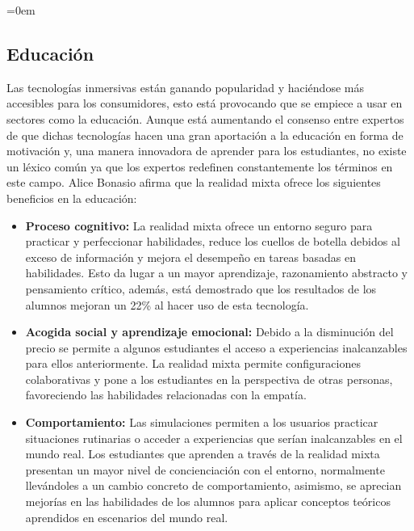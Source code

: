 \parindent=0em
\subsection{Educación}
\noindent

Las tecnologías inmersivas están ganando popularidad y haciéndose más accesibles para los consumidores, esto está provocando que se empiece a usar en sectores como la educación. Aunque está aumentando el consenso entre expertos de que dichas tecnologías hacen una gran aportación a la educación en forma de motivación y, una manera innovadora de aprender para los estudiantes, no existe un léxico común ya que los expertos redefinen constantemente los términos en este campo. Alice Bonasio \cite{microsoftEducation} afirma que la realidad mixta ofrece los siguientes beneficios en la educación:

\begin{itemize}
    \item \textbf{Proceso cognitivo:} La realidad mixta ofrece un entorno seguro para practicar y perfeccionar habilidades, reduce los cuellos de botella debidos al exceso de información y mejora el desempeño en tareas basadas en habilidades. Esto da lugar a un mayor aprendizaje, razonamiento abstracto y pensamiento crítico, además, está demostrado que los resultados de los alumnos mejoran un 22\% al hacer uso de esta tecnología. 
    
     \item \textbf{Acogida social y aprendizaje emocional:} Debido a la disminución del precio se permite a algunos estudiantes el acceso a experiencias inalcanzables para ellos anteriormente. La realidad mixta permite configuraciones colaborativas y pone a los estudiantes en la perspectiva de otras personas, favoreciendo las habilidades relacionadas con la empatía.
     
     \item \textbf{Comportamiento:} Las simulaciones permiten a los usuarios practicar situaciones rutinarias o acceder a experiencias que serían inalcanzables en el mundo real. Los estudiantes que aprenden a través de la realidad mixta presentan un mayor nivel de concienciación con el entorno, normalmente llevándoles a un cambio concreto de comportamiento, asimismo, se aprecian mejorías en las habilidades de los alumnos para aplicar conceptos teóricos aprendidos en escenarios del mundo real.
\end{itemize}

